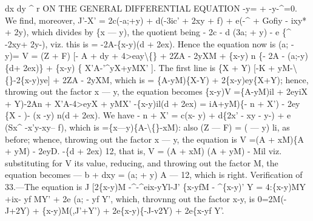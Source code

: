 \documentclass[12pt,a4paper]{article}
\begin{document}
dx
dy
\textasciicircum{}
r
ON THE GENERAL DIFFERENTIAL EQUATION -y= + -y-\textasciicircum{}=0.
We
find, moreover,
J'-X' = 2c(-a;+y) + d(-3ic' + 2xy + f) + e(-\textasciicircum{} + Gofiy - ixy* + 2y\guillemotright{}),
which divides by \{x --- y), the quotient being
- 2c - d (3a; + y) - e \{\textasciicircum{} -2xy+ 2y-),
viz.
this
is
= -2A-\{x-y)(d + 2ex).
Hence the equation now
is
(a; - y)= V = (Z + F) [- A + dy + 4>eay\textbackslash\{\} + 2ZA - 2yXM
+ \{x-y) n \{- 2A - (a;-y)\{d+ 2ex)\}
+ \{x-y)
\{
X'A-'\textasciicircum{}yX+yMX'
].
The
first
line
is
\{X + Y) [-K + yM-\textbackslash\{\}-2\{x-y)ye] + 2ZA - 2yXM,
which
is
= \{A-yM)\{X-Y) + 2\{x-y)ey\{X+Y);
hence, throwing out the
factor x --- y, the equation becomes
\{x-y)V =\{A-yM)il + 2eyiX + Y)-2An + X'A-4>eyX + yMX' -\{x-y)il(d + 2ex)
= iA+yM)\{- n + X') - 2ey \{X - \textyen{})- (x -y) n(d + 2ex).
We have
- n + X' = c(x- y) + d\{2x' - xy - y-) + e (Sx\textasciicircum{} -x'y-xy-- f),
which
is =\{x---y)\{A-\textbackslash\{\}-xM):
also (Z --- F) = (\guillemotleft{} --- y) li,
as
before;
whence, throwing out
the
factor x --- y, the equation
is
V =(A + xM)\{A + yM) - 2eyD. -\{d + 2ex) 12,
that
is,
V = (A + xM) (A + yM) - Mil
viz.
substituting
for
V
its
value,
reducing,
and
throwing
out
the
factor
M,
the
equation becomes
--- b + dxy = (a; + y) A --- 12,
which
is
right.
Verification of 33.---The equation
is
J [2\{x-y)M -\textasciicircum{}-\textasciicircum{}eix-yYl-J' \{x-yfM - \textasciicircum{}\{x-y)' Y
= 4:\{x-y)MY +ix- yf MY' + 2e (a; - yf Y',
which, throvnng out the factor x-y,
is
0=2M(-J+2Y) + \{x-y)M(,J'+Y') + 2e\{x-y)\{-J-v2Y) + 2e\{x-yf Y'.
\end{document}
